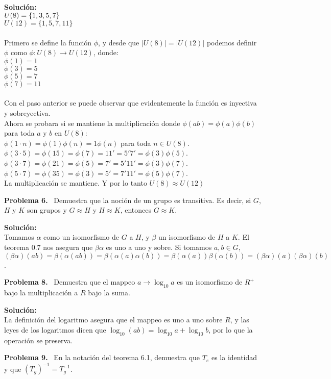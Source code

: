 \documentclass{article}
\newcounter{problem}
\newcounter{solution}
\newcommand\Problem[1]{%
  \stepcounter{problem}%
  \textbf{Problema #1.}~%
  \setcounter{solution}{0}%
}
\newcommand\TheSolution{%
  \textbf{Solución:}\\%
}
\begin{document}
\TheSolution{}
$\\U(8) = \{1,3,5,7\}$\\
		$U(12) = \{1,5,7,11\}$\\
		\\
    Primero se define la funci\'on $\phi$, y desde que $|U(8)| = |U(12)|$
    podemos definir $\phi$ como $\phi: U(8) \rightarrow U(12)$, donde:\\
    $\phi(1) = 1$\\
		$\phi(3) = 5$\\
		$\phi(5) = 7$\\
		$\phi(7) = 11$\\
		\\
    Con el paso anterior se puede observar que evidentemente la funci\'on es
    inyectiva y sobreyectiva.\\ Ahora se probara si se mantiene la
    multiplicaci\'on donde $\phi(ab) = \phi(a)\phi(b)$ para toda $a$ y $b$ en
    $U(8)$:\\
		$\phi(1\cdot n) = \phi(1)\phi(n) = 1\phi(n)$ para toda $n \in U(8)$.\\
		$\phi(3\cdot 5) = \phi(15) = \phi(7) = 11'= 5'7'= \phi(3)\phi(5)$.\\
		$\phi(3\cdot 7) = \phi(21) = \phi(5) = 7' = 5'11' = \phi(3)\phi(7)$.\\
		$\phi(5\cdot 7) = \phi(35) = \phi(3) = 5' = 7'11' = \phi(5)\phi(7)$.\\
		La multiplicaci\'on se mantiene. Y por lo tanto $U(8) \approx U(12)$

\Problem{6} Demuestra que la noción de un grupo es transitiva. Es decir, si
$G$, $H$ y $K$ son grupos y $G \approx H$ y $H \approx K$, entonces $G \approx
K$.

\TheSolution{}
Tomamos $\alpha$ como un isomorfismo de $G$ a $H$, y $\beta$ un isomorfismo de
$H$ a $K$. El teorema 0.7 nos asegura que $\beta\alpha$ es uno a uno y sobre.
Si tomamos $a, b \in G$, $(\beta\alpha)(ab) = \beta(\alpha(ab)) =
\beta(\alpha(a)\alpha(b)) = \beta(\alpha(a))\beta(\alpha(b)) = (\beta\alpha)
(a)(\beta\alpha)(b)$.

\Problem{8} Demuestra que el mappeo $a \rightarrow \log_{10}a$ es un
isomorfismo de $R^+$ bajo la multiplicación a $R$ bajo la suma.

\TheSolution{} La definición del logaritmo asegura que el mappeo es uno a uno
sobre $R$, y las leyes de los logaritmos dicen que $\log_{10}(ab) = \log_{10}
a + \log_{10}b$, por lo que la operación se preserva.

\Problem{9} En la notación del teorema 6.1, demuestra que $T_e$ es la identidad
y que ${(T_g)}^{-1} = T_g^{-1}$.
\end{document}
